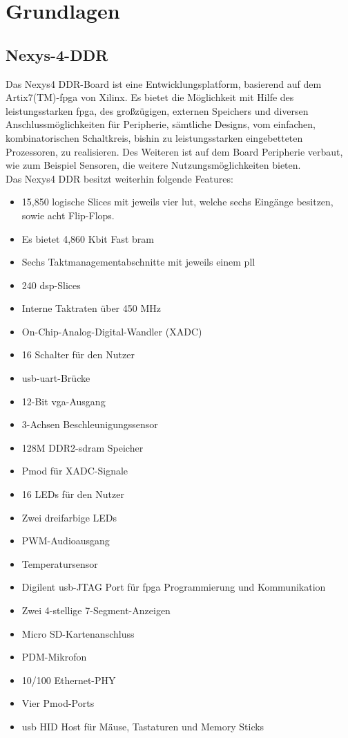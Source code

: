 \chapter{Grundlagen}\label{kap:grundlagen}


\section{Nexys-4-DDR}\label{kap:nexys4}
Das Nexys4 DDR-Board ist eine Entwicklungsplatform, basierend auf dem Artix7(TM)-\ac{fpga}
von Xilinx. Es bietet die Möglichkeit mit Hilfe des leistungsstarken \ac{fpga}, des großzügigen, externen Speichers und diversen Anschlussmöglichkeiten
für Peripherie, sämtliche Designs, vom einfachen, kombinatorischen Schaltkreis, bishin zu leistungsstarken eingebetteten Prozessoren, zu realisieren.
Des Weiteren ist auf dem Board Peripherie verbaut, wie zum Beispiel Sensoren, die weitere Nutzungsmöglichkeiten bieten.\\
Das Nexys4 DDR besitzt weiterhin folgende Features:~\cite{digilent}\\
\begin{itemize}
  \item 15,850 logische Slices mit jeweils vier \ac{lut}, welche sechs Eingänge besitzen, sowie acht Flip-Flops.
  \item Es bietet 4,860 Kbit Fast \ac{bram}
  \item Sechs Taktmanagementabschnitte mit jeweils einem \ac{pll}
  \item 240 \ac{dsp}-Slices
  \item Interne Taktraten über 450 MHz
  \item On-Chip-Analog-Digital-Wandler (XADC)
  \item 16 Schalter für den Nutzer
  \item \ac{usb}-\ac{uart}-Brücke
  \item 12-Bit \ac{vga}-Ausgang
  \item 3-Achsen Beschleunigungssensor
  \item 128M DDR2-\ac{sdram} Speicher
  \item Pmod für XADC-Signale
  \item 16 LEDs für den Nutzer
  \item Zwei dreifarbige LEDs
  \item PWM-Audioausgang
  \item Temperatursensor
  \item Digilent \ac{usb}-JTAG Port für \ac{fpga} Programmierung und Kommunikation
  \item Zwei 4-stellige 7-Segment-Anzeigen
  \item Micro SD-Kartenanschluss
  \item PDM-Mikrofon
  \item 10/100 Ethernet-PHY
  \item Vier Pmod-Ports
  \item \ac{usb} HID Host für Mäuse, Tastaturen und Memory Sticks
\end{itemize}



